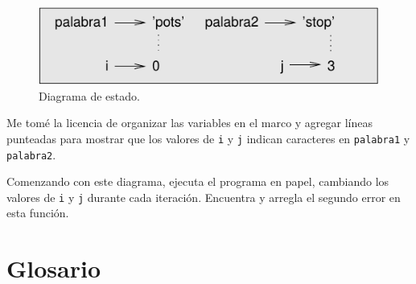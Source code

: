 \documentclass[10pt]{book}
\begin{document}
\begin{figure}
\centerline
{\includegraphics[scale=0.8]{figs/state4.pdf}}
\caption{Diagrama de estado.}
\label{fig.state4}
\end{figure}

Me tomé la licencia de organizar las variables en el marco
y agregar líneas punteadas para mostrar que los valores de {\tt i} y
{\tt j} indican caracteres en {\tt palabra1} y {\tt palabra2}.

Comenzando con este diagrama, ejecuta el programa en papel, cambiando los
valores de {\tt i} y {\tt j} durante cada iteración.  Encuentra y arregla el
segundo error en esta función.
\label{isreverse}


\section{Glosario}
\end{document}
